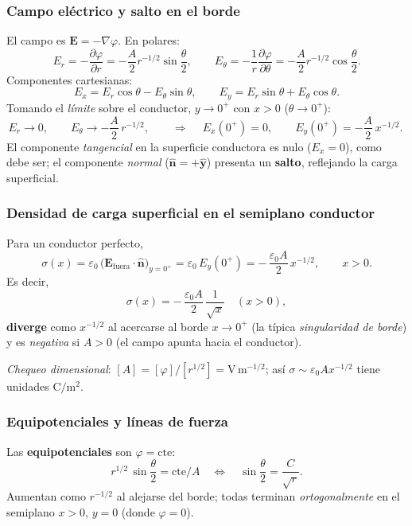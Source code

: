 \documentclass{article}
\begin{document}
\subsubsection*{Campo eléctrico y salto en el borde}
El campo es $\mathbf E=-\nabla\varphi$. En polares:
\[
E_r=-\frac{\partial\varphi}{\partial r}=-\frac{A}{2}r^{-1/2}\sin\!\frac{\theta}{2},\qquad
E_\theta=-\frac{1}{r}\frac{\partial\varphi}{\partial\theta}
=-\frac{A}{2}r^{-1/2}\cos\!\frac{\theta}{2}.
\]
Componentes cartesianas:
\[
E_x=E_r\cos\theta - E_\theta\sin\theta,\qquad
E_y=E_r\sin\theta + E_\theta\cos\theta.
\]
Tomando el \emph{límite} sobre el conductor, $y\to 0^{+}$ con $x>0$ ($\theta\to 0^{+}$):
\[
E_r\to 0,\qquad E_\theta\to -\frac{A}{2}\,r^{-1/2},\qquad
\Rightarrow\quad
\boxed{\ E_x(0^+)=0,\qquad E_y(0^+)=-\frac{A}{2}\,x^{-1/2}. \ }
\]
El componente \emph{tangencial} en la superficie conductora es nulo ($E_x=0$), como debe ser; el componente \emph{normal} ($\hat{\mathbf n}=+\hat{\mathbf y}$) presenta un \textbf{salto}, reflejando la carga superficial.

\subsubsection*{Densidad de carga superficial en el semiplano conductor}
Para un conductor perfecto,
\[
\sigma(x)=\varepsilon_0\,\big(\mathbf E_{\text{fuera}}\cdot\hat{\mathbf n}\big)_{y=0^+}
=\varepsilon_0\,E_y(0^+)
=-\,\frac{\varepsilon_0 A}{2}\,x^{-1/2},\qquad x>0.
\]
Es decir,
\[
\boxed{\ \sigma(x)= -\,\frac{\varepsilon_0 A}{2}\,\frac{1}{\sqrt{x}}\quad (x>0),\ }
\]
\textbf{diverge} como $x^{-1/2}$ al acercarse al borde $x\to 0^+$ (la típica \emph{singularidad de borde}) y es \emph{negativa} si $A>0$ (el campo apunta hacia el conductor).

\emph{Chequeo dimensional}: $[A]=[\varphi]/[r^{1/2}] = \mathrm{V}\,\mathrm{m}^{-1/2}$; así $\sigma\sim \varepsilon_0 A x^{-1/2}$ tiene unidades $\mathrm{C/m^2}$.

\subsubsection*{Equipotenciales y líneas de fuerza}
Las \textbf{equipotenciales} son $\varphi=\text{cte}$:
\[
r^{1/2}\,\sin\!\frac{\theta}{2}=\text{cte}/A
\quad\Longleftrightarrow\quad
\sin\!\frac{\theta}{2}=\frac{C}{\sqrt{r}}.
\]
Aumentan como $r^{-1/2}$ al alejarse del borde; todas terminan \emph{ortogonalmente} en el semiplano $x>0$, $y=0$ (donde $\varphi=0$).
\end{document}
